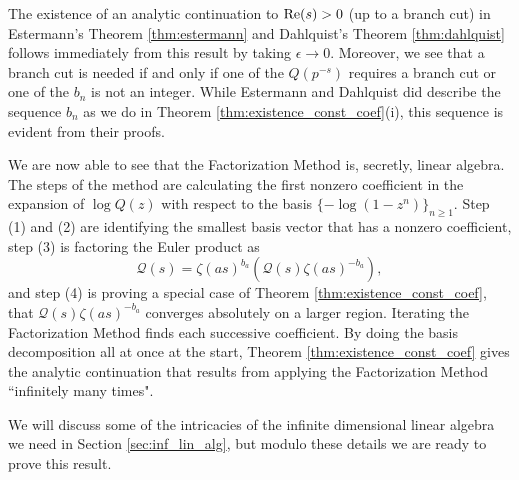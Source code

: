 \documentclass[12pt]{amsart}
\theoremstyle{plain}
\begin{document}
The existence of an analytic continuation to ${\rm Re}(s)>0$ (up to a branch cut) in Estermann's Theorem \ref{thm:estermann} and Dahlquist's Theorem \ref{thm:dahlquist} follows immediately from this result by taking $\epsilon \to 0$. Moreover, we see that a branch cut is needed if and only if one of the $Q(p^{-s})$ requires a branch cut or one of the $b_n$ is not an integer. While Estermann and Dahlquist did describe the sequence $b_n$ as we do in Theorem \ref{thm:existence_const_coef}(i), this sequence is evident from their proofs.

We are now able to see that the Factorization Method is, secretly, linear algebra. The steps of the method are calculating the first nonzero coefficient in the expansion of $\log Q(z)$ with respect to the basis $\{-\log(1-z^n)\}_{n\ge 1}$. Step (1) and (2) are identifying the smallest basis vector that has a nonzero coefficient, step (3) is factoring the Euler product as
\[
    \mathcal{Q}(s) = \zeta(as)^{b_a} \left(\mathcal{Q}(s)\zeta(as)^{-b_a}\right),
\]
and step (4) is proving a special case of Theorem \ref{thm:existence_const_coef}, that $\mathcal{Q}(s)\zeta(as)^{-b_a}$ converges absolutely on a larger region. Iterating the Factorization Method finds each successive coefficient. By doing the basis decomposition all at once at the start, Theorem \ref{thm:existence_const_coef} gives the analytic continuation that results from applying the Factorization Method ``infinitely many times".

We will discuss some of the intricacies of the infinite dimensional linear algebra we need in Section \ref{sec:inf_lin_alg}, but modulo these details we are ready to prove this result.
\end{document}
